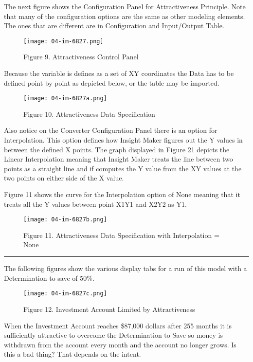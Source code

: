 \documentclass[]{memoir}
\let\Oldincludegraphics\includegraphics
\renewcommand{\includegraphics}[1]{\Oldincludegraphics[max size={\textwidth}{\textheight}]{#1}}
\begin{document}
The next figure shows the Configuration Panel for Attractiveness
Principle. Note that many of the configuration options are the same as
other modeling elements. The ones that are different are in
Configuration and Input/Output Table.

\begin{figure}[htbp]
\centering
\texttt{[image: 04-im-6827.png]}
\caption{Figure 9. Attractiveness Control Panel}
\end{figure}

Because the variable is defines as a set of XY coordinates the Data has
to be defined point by point as depicted below, or the table may be
imported.

\begin{figure}[htbp]
\centering
\texttt{[image: 04-im-6827a.png]}
\caption{Figure 10. Attractiveness Data Specification}
\end{figure}

Also notice on the Converter Configuration Panel there is an option for
Interpolation. This option defines how Insight Maker figures out the Y
values in between the defined X points. The graph displayed in Figure 21
depicts the Linear Interpolation meaning that Insight Maker treats the
line between two points as a straight line and if computes the Y value
from the XY values at the two points on either side of the X value.

Figure 11 shows the curve for the Interpolation option of None meaning
that it treats all the Y values between point X1Y1 and X2Y2 as Y1.

\begin{figure}[htbp]
\centering
\texttt{[image: 04-im-6827b.png]}
\caption{Figure 11. Attractiveness Data Specification with Interpolation
= None}
\end{figure}

\begin{center}\rule{3in}{0.4pt}\end{center}

The following figures show the various display tabs for a run of this
model with a Determination to save of 50\%.

\begin{figure}[htbp]
\centering
\texttt{[image: 04-im-6827c.png]}
\caption{Figure 12. Investment Account Limited by Attractiveness}
\end{figure}

When the Investment Account reaches \$87,000 dollars after 255 months it
is sufficiently attractive to overcome the Determination to Save so
money is withdrawn from the account every month and the account no
longer grows. Is this a bad thing? That depends on the intent.
\end{document}
